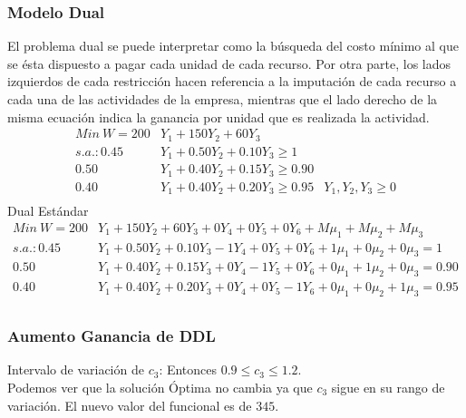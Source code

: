 \begin{homeworkProblem}[-1][Heladería]
\subsubsection{Modelo Dual}
El problema dual se puede interpretar como la búsqueda del costo mínimo al que se ésta dispuesto a pagar cada unidad de cada recurso. Por otra parte, los lados izquierdos de cada restricción hacen referencia a la imputación de cada recurso a cada una de las actividades de la empresa, mientras que el lado derecho de la misma ecuación indica la ganancia por unidad que es realizada la actividad.
\begin{align*}
    Min\ W = 200&Y_1 +150Y_2 + 60Y_3 \\
    s.a.: 0.45&Y_1 + 0.50Y_2 +0.10Y_3 \ge 1\\
          0.50&Y_1 + 0.40Y_2 +0.15Y_3 \ge 0.90\\
          0.40&Y_1 + 0.40Y_2 +0.20Y_3 \ge 0.95
          &Y_1,Y_2,Y_3 \ge 0\\
\end{align*}
Dual Estándar 
\begin{align*}
    Min\ W = 200&Y_1 +150Y_2 + 60Y_3 + 0Y_4 + 0Y_5 + 0Y_6 + M\mu_1 + M\mu_2 + M\mu_3 \\
    s.a.: 0.45&Y_1 + 0.50Y_2 +0.10Y_3 - 1Y_4 + 0Y_5 + 0Y_6 + 1\mu_1 + 0\mu_2 + 0\mu_3 = 1\\
          0.50&Y_1 + 0.40Y_2 +0.15Y_3 + 0Y_4 - 1Y_5 + 0Y_6 + 0\mu_1 + 1\mu_2 + 0\mu_3 = 0.90\\
          0.40&Y_1 + 0.40Y_2 +0.20Y_3 + 0Y_4 + 0Y_5 - 1Y_6 + 0\mu_1 + 0\mu_2 + 1\mu_3 = 0.95\\
\end{align*}

\subsubsection{Aumento Ganancia de DDL}
Intervalo de variación de $c_3$:
Entonces   $0.9 \le c_3 \le 1.2$. \\
Podemos ver que la solución Óptima no cambia ya que $c_3$ sigue en su rango de variación.
El nuevo valor del funcional es de $345$.


\end{homeworkProblem}
